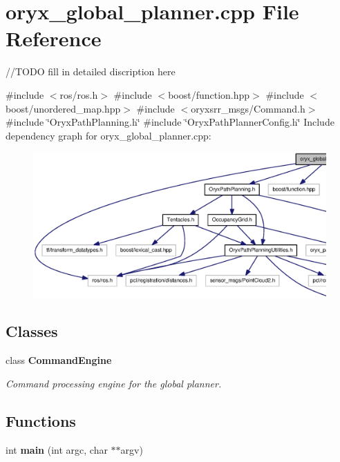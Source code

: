 \section{oryx\-\_\-global\-\_\-planner.\-cpp \-File \-Reference}
\label{oryx__global__planner_8cpp}


//\-T\-O\-D\-O fill in detailed discription here  


{\ttfamily \#include $<$ros/ros.\-h$>$}\*
{\ttfamily \#include $<$boost/function.\-hpp$>$}\*
{\ttfamily \#include $<$boost/unordered\-\_\-map.\-hpp$>$}\*
{\ttfamily \#include $<$oryxsrr\-\_\-msgs/\-Command.\-h$>$}\*
{\ttfamily \#include \char`\"{}\-Oryx\-Path\-Planning.\-h\char`\"{}}\*
{\ttfamily \#include \char`\"{}\-Oryx\-Path\-Planner\-Config.\-h\char`\"{}}\*
\-Include dependency graph for oryx\-\_\-global\-\_\-planner.\-cpp\-:
\nopagebreak
\begin{figure}[H]
\begin{center}
\leavevmode
\includegraphics[width=350pt]{oryx__global__planner_8cpp__incl}
\end{center}
\end{figure}
\subsection*{\-Classes}
\begin{DoxyCompactItemize}
\item 
class {\bf \-Command\-Engine}
\begin{DoxyCompactList}\small\item\em \-Command processing engine for the global planner. \end{DoxyCompactList}\end{DoxyCompactItemize}
\subsection*{\-Functions}
\begin{DoxyCompactItemize}
\item 
int {\bf main} (int argc, char $\ast$$\ast$argv)
\end{DoxyCompactItemize}



